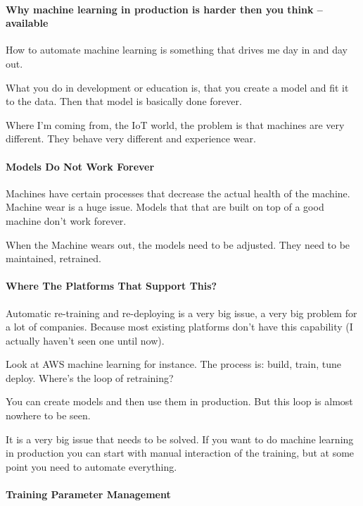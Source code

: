 \documentclass[12pt]{scrartcl} %
\begin{document}
\paragraph{Why machine learning in production is harder then you think -- available}
How to automate machine learning is something that drives me day in and day out.

What you do in development or education is, that you create a model and fit it to the data. Then that model is basically done forever.

Where I’m coming from, the IoT world, the problem is that machines are very different. They behave very different and experience wear.

\paragraph{Models Do Not Work Forever}

Machines have certain processes that decrease the actual health of the machine. Machine wear is a huge issue. Models that that are built on top of a good machine don’t work forever.

When the Machine wears out, the models need to be adjusted. They need to be maintained, retrained.


\paragraph{Where The Platforms That Support This?}

Automatic re-training and re-deploying is a very big issue, a very big problem for a lot of companies. Because most existing platforms don’t have this capability (I actually haven't seen one until now).

Look at AWS machine learning for instance. The process is: build, train, tune deploy. Where’s the loop of retraining?

You can create models and then use them in production. But this loop is almost nowhere to be seen.

It is a very big issue that needs to be solved. If you want to do machine learning in production you can start with manual interaction of the training, but at some point you need to automate everything.

\paragraph{Training Parameter Management}
\end{document}
